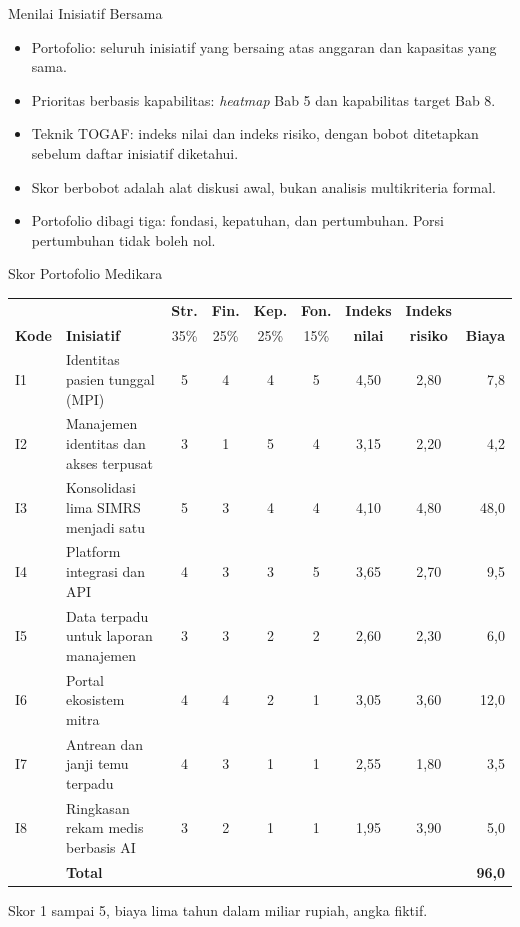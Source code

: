 \documentclass[aspectratio=169, table, 12pt]{beamer}
\begin{document}
\begin{frame}{{\Large Menilai Inisiatif Bersama}}
  \small
  \vspace{4pt}
  \begin{itemize}
    \item Portofolio: seluruh inisiatif yang bersaing atas anggaran dan kapasitas yang sama.
    \item Prioritas berbasis kapabilitas: \textit{heatmap} Bab 5 dan kapabilitas target Bab 8.
    \item Teknik TOGAF: indeks nilai dan indeks risiko, dengan bobot ditetapkan sebelum daftar inisiatif
          diketahui.
    \item Skor berbobot adalah alat diskusi awal, bukan analisis multikriteria formal.
    \item Portofolio dibagi tiga: fondasi, kepatuhan, dan pertumbuhan. Porsi pertumbuhan tidak boleh
          nol.
  \end{itemize}
\end{frame}

\begin{frame}{{\Large Skor Portofolio Medikara}}
  \scriptsize
  \setlength{\tabcolsep}{4pt}
  \begin{tabularx}{\textwidth}{lYcccccc r}
    \hline
    & & \textbf{Str.} & \textbf{Fin.} & \textbf{Kep.} & \textbf{Fon.} &
      \textbf{Indeks} & \textbf{Indeks} & \\
    \textbf{Kode} & \textbf{Inisiatif} & 35\% & 25\% & 25\% & 15\% &
      \textbf{nilai} & \textbf{risiko} & \textbf{Biaya} \\
    \hline
    I1 & Identitas pasien tunggal (MPI) & 5 & 4 & 4 & 5 & 4,50 & 2,80 & 7,8 \\
    \hline
    I2 & Manajemen identitas dan akses terpusat & 3 & 1 & 5 & 4 & 3,15 & 2,20 & 4,2 \\
    \hline
    I3 & Konsolidasi lima SIMRS menjadi satu & 5 & 3 & 4 & 4 & 4,10 & 4,80 & 48,0 \\
    \hline
    I4 & Platform integrasi dan API & 4 & 3 & 3 & 5 & 3,65 & 2,70 & 9,5 \\
    \hline
    I5 & Data terpadu untuk laporan manajemen & 3 & 3 & 2 & 2 & 2,60 & 2,30 & 6,0 \\
    \hline
    I6 & Portal ekosistem mitra & 4 & 4 & 2 & 1 & 3,05 & 3,60 & 12,0 \\
    \hline
    I7 & Antrean dan janji temu terpadu & 4 & 3 & 1 & 1 & 2,55 & 1,80 & 3,5 \\
    \hline
    I8 & Ringkasan rekam medis berbasis AI & 3 & 2 & 1 & 1 & 1,95 & 3,90 & 5,0 \\
    \hline
    & \textbf{Total} & & & & & & & \textbf{96,0} \\
    \hline
  \end{tabularx}

  \vspace{4pt}
  \small Skor 1 sampai 5, biaya lima tahun dalam miliar rupiah, angka fiktif.
\end{frame}
\end{document}

